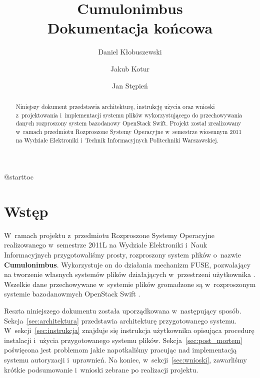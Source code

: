 

\usepackage{microtype}


\def\cb{Cumulonimbus}
\def\todo{\textbf{TODO}: }

\title{\cb{} \\ \Large Dokumentacja końcowa}
\author{Daniel Kłobuszewski \and Jakub Kotur \and Jan Stępień}



\maketitle

\begin{abstract}
	Niniejszy dokument przedstawia architekturę, instrukcję użycia oraz wnioski
	z~projektowania i~implementacji systemu plików wykorzystującego do
	przechowywania danych rozproszony system bazodanowy OpenStack Swift. Projekt
	został zrealizowany w~ramach przedmiotu Rozproszone Systemy Operacyjne
	w~semestrze wiosennym 2011 na Wydziale Elektroniki i~Technik Informacyjnych
	Politechniki Warszawskiej.
\end{abstract}

\setcounter{tocdepth}{2}
\csname @starttoc

\section{Wstęp}

W~ramach projektu z~przedmiotu Rozproszone Systemy Operacyjne realizowanego
w~semestrze 2011L na Wydziale Elektroniki i~Nauk Informacyjnych przygotowaliśmy
prosty, rozproszony system plików o~nazwie \textbf{Cumulonimbus}. Wykorzystuje
on do działania mechanizm FUSE, pozwalający na tworzenie własnych systemów
plików działających w~przestrzeni użytkownika \cite{fuse}. Wszelkie dane
przechowywane w~systemie plików gromadzone są w~rozproszonym systemie
bazodanowmych OpenStack Swift \cite{swift_doc}.

Reszta niniejszego dokumentu została uporządkowana w~następujący sposób.
Sekcja~\ref{sec:architektura} przedstawia architekturę przygotowanego systemu.
W~sekcji~\ref{sec:instrukcja} znajduje się instrukcja użytkownika opisująca
procedurę instalacji i~użycia przygotowanego systemu plików.
Sekcja~\ref{sec:post_mortem} poświęcona jest problemom jakie napotkaliśmy
pracując nad implementacją systemu autoryzacji i~uprawnień. Na koniec,
w~sekcji~\ref{sec:wnioski}, zawarliśmy krótkie podsumowanie i~wnioski zebrane po
realizacji projektu.

